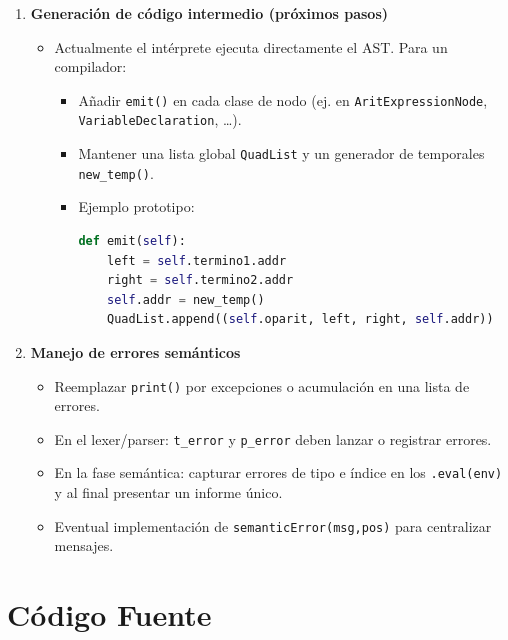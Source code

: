 \documentclass{article}
\begin{document}
\begin{enumerate}
  \item \textbf{Generación de código intermedio (próximos pasos)}  
    \begin{itemize}
      \item Actualmente el intérprete ejecuta directamente el AST. Para un compilador:
        \begin{itemize}
          \item Añadir \texttt{emit()} en cada clase de nodo (ej. en \texttt{AritExpressionNode}, \texttt{VariableDeclaration}, …).
          \item Mantener una lista global \texttt{QuadList} y un generador de temporales \texttt{new\_temp()}.
          \item Ejemplo prototipo:
            \begin{lstlisting}[language=Python]
def emit(self):
    left = self.termino1.addr
    right = self.termino2.addr
    self.addr = new_temp()
    QuadList.append((self.oparit, left, right, self.addr))
            \end{lstlisting}
        \end{itemize}
    \end{itemize}

  \item \textbf{Manejo de errores semánticos}  
    \begin{itemize}
      \item Reemplazar \texttt{print()} por excepciones o acumulación en una lista de errores.
      \item En el lexer/parser: \texttt{t\_error} y \texttt{p\_error} deben lanzar o registrar errores.
      \item En la fase semántica: capturar errores de tipo e índice en los \texttt{.eval(env)} y al final presentar un informe único.
      \item Eventual implementación de \texttt{semanticError(msg,pos)} para centralizar mensajes.
    \end{itemize}
\end{enumerate}




\section{Código Fuente}\label{sec:cod}
\end{document}
